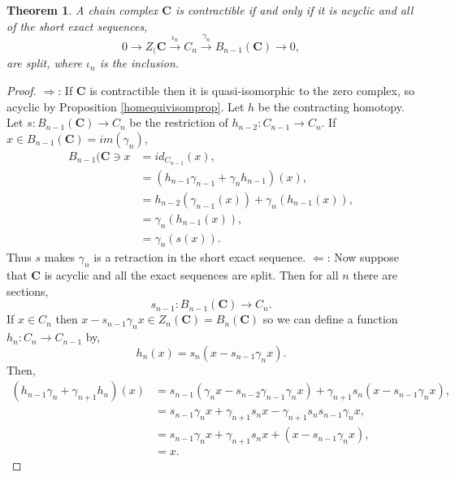 \documentclass[11.5pt, twoside, a4paper, titlepage]{report}
\theoremstyle{definition}
\theoremstyle{plain}
\newtheorem{thm}[mydef]{Theorem}
\begin{document}
\begin{thm}
A chain complex $\mathbf{C}$ is contractible if and only if it is acyclic and all of the short exact sequences,
\begin{equation*}
0 \xrightarrow{} Z_(\mathbf{C} \xrightarrow{\iota_n} C_n \xrightarrow{\gamma_n} B_{n-1}(\mathbf{C})\xrightarrow{} 0,
\end{equation*}
are split, where $\iota_n$ is the inclusion.
\end{thm}
\begin{proof}
$\Rightarrow$: If $\mathbf{C}$ is contractible then it is quasi-isomorphic to the zero complex, so acyclic by Proposition \ref{homequivisomprop}. Let $h$ be the contracting homotopy. Let $s:B_{n-1}(\mathbf{C})\to C_n$ be the restriction of $h_{n-2}:C_{n-1} \to C_n$. If $x\in B_{n-1}(\mathbf{C})=im(\gamma_n)$,
\begin{align*}
B_{n-1}(\mathbf{C}\ni x&=id_{C_{n-1}}(x),\\
&=(h_{n-1}\gamma_{n-1} + \gamma_nh_{n-1})(x),\\
&=h_{n-2}(\gamma_{n-1}(x))+\gamma_n(h_{n-1}(x)),\\
&=\gamma_n(h_{n-1}(x)),\\
&=\gamma_n(s(x)).
\end{align*}
Thus $s$ makes $\gamma_n$ is a retraction in the short exact sequence.
$\Leftarrow$: Now suppose that $\mathbf{C}$ is acyclic and all the exact sequences are split. Then for all $n$ there are sections,
\begin{equation*}
s_{n-1}: B_{n-1}(\mathbf{C}) \to C_n.
\end{equation*}
If $x\in C_n$ then $x-s_{n-1}\gamma_nx\in Z_n(\mathbf{C})=B_n(\mathbf{C})$ so we can define a function $h_n: C_n \to C_{n-1}$ by,
\begin{equation*}
h_n(x)=s_n(x-s_{n-1}\gamma_nx).
\end{equation*}
Then,
\begin{align*}
(h_{n-1}\gamma_n + \gamma_{n+1}h_n)(x)&=s_{n-1}(\gamma_nx-s_{n-2}\gamma_{n-1}\gamma_nx) + \gamma_{n+1}s_n(x - s_{n-1}\gamma_nx),\\
&=s_{n-1}\gamma_nx +\gamma_{n+1}s_nx-\gamma_{n+1}s_ns_{n-1}\gamma_nx,\\
&=s_{n-1}\gamma_nx + \gamma_{n+1}s_nx +(x-s_{n-1}\gamma_nx),\\
&=x.
\end{align*}
\end{proof}
\end{document}
